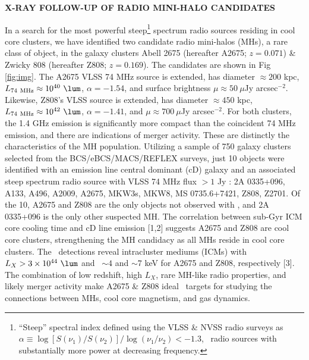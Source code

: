 \documentclass[letterpaper,11pt]{article}
\begin{document}
\pagestyle{plain}

\begin{center}
  {\bf\uppercase{X-ray follow-up of radio mini-halo candidates}}
\end{center}
 In a search for the most powerful
steep\footnote{``Steep'' spectral index defined using the VLSS \& NVSS
  radio surveys as $\alpha \equiv \log [S(\nu_1)/S(\nu_2)]/\log
  (\nu_1/\nu_2) < -1.3$, \eg\ radio sources with substantially more
  power at decreasing frequency.} spectrum radio sources residing in
cool core clusters, we have identified two candidate radio mini-halos
(MHs), a rare class of object, in the galaxy clusters Abell 2675
(hereafter A2675; $z = 0.071$) \& Zwicky 808 (hereafter Z808; $z =
0.169$). The candidates are shown in Fig \ref{fig:img}. The A2675 VLSS
74 MHz source is extended, has diameter $\approx 200$ kpc,
$L_{74~\mathrm{MHz}} \approx 10^{40} ~\lum$, $\alpha = -1.54$, and
surface brightness $\mu \approx 50 ~\mu$Jy arcsec$^{-2}$. Likewise,
Z808's VLSS source is extended, has diameter $\approx 450$ kpc,
$L_{74~\mathrm{MHz}} \approx 10^{42} ~\lum$, $\alpha = -1.41$, and
$\mu \approx 700 ~\mu$Jy arcsec$^{-2}$. For both clusters, the 1.4 GHz
emission is significantly more compact than the coincident 74 MHz
emission, and there are indications of merger activity. These are
distinctly the characteristics of the MH population. Utilizing a
sample of 750 galaxy clusters selected from the BCS/eBCS/MACS/REFLEX
surveys, just 10 objects were identified with an emission line central
dominant (cD) galaxy and an associated steep spectrum radio source
with VLSS 74 MHz flux $> 1$ Jy : 2A 0335+096, A133, A496, A2009,
A2675, MKW3s, MKW8, MS 0735.6+7421, Z808, Z2701. Of the 10, A2675 and
Z808 are the only objects not observed with \chandra, and 2A 0335+096
is the only other suspected MH. The correlation between sub-Gyr ICM
core cooling time and cD line emission [1,2] suggests A2675 and Z808
are cool core clusters, strengthening the MH candidacy as all MHs
reside in cool core clusters. The \rosat\ detections reveal
intracluster mediums (ICMs) with $L_X > 3 \times 10^{44} ~\lum$ and
\tcl\ $\sim 4$ and $\sim 7$ keV for A2675 and Z808, respectively
      [3]. The combination of low redshift, high $L_X$, rare MH-like
      radio properties, and likely merger activity make A2675 \& Z808
      ideal \chandra\ targets for studying the connections between
      MHs, cool core magnetism, and gas dynamics. \vspace{5.5pt}
\end{document}
